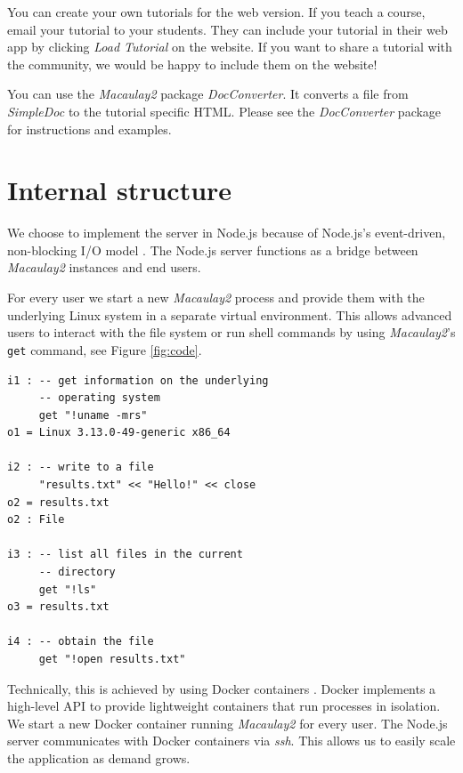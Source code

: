 \documentclass[twocolumn]{article}
\def\M2{{\it Macaulay2}}
\begin{document}
You can create your own tutorials for the web version. If you teach a course,
email your tutorial to your students. They can include your tutorial in their web app by clicking
{\it Load Tutorial} on the website.
If you want to share a tutorial with the community, we would
be happy to include them on the website!

You can use the \M2 package {\it DocConverter}.
It converts a file from {\it SimpleDoc} to the tutorial specific HTML. Please see the
{\it DocConverter} package for instructions and examples.


\section{Internal structure}

We choose to implement the server in Node.js
because of Node.js's event-driven, non-blocking I/O model \cite{nodejs}.
The Node.js server functions as a bridge between \M2 instances and end users.

For every user we start a new \M2 process and
provide them with the underlying Linux system in a separate virtual environment.
This allows advanced users to
interact with the file system or run shell commands by using \M2's {\tt get} 
command, see Figure \ref{fig:code}.

\begin{verbatim}
i1 : -- get information on the underlying 
     -- operating system
     get "!uname -mrs" 
o1 = Linux 3.13.0-49-generic x86_64

i2 : -- write to a file     
     "results.txt" << "Hello!" << close
o2 = results.txt
o2 : File

i3 : -- list all files in the current 
     -- directory
     get "!ls"
o3 = results.txt

i4 : -- obtain the file
     get "!open results.txt"
\end{verbatim}


Technically, this is achieved by using Docker containers \cite{docker}. Docker implements
a high-level API to provide lightweight containers that run processes in isolation.
We start a new Docker container running \M2 for every user. The Node.js
server communicates with Docker containers via {\it ssh}. This allows us to easily
scale the application as demand grows.
\end{document}
